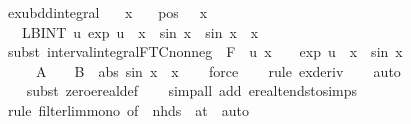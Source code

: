 \documentclass[leqno]{article}
\theoremstyle{definition}
\begin{document}
\begin{figure}
\begin{isabellebody}
\isamarkupfalse%
\ ex{\isacharunderscore}{}{}{\isacharunderscore}{}{\isacharunderscore}{}{\isacharunderscore}ubdd{\isacharunderscore}integral{\isacharcolon}\isanewline
\ \ \ x\isanewline
\ \ \ pos{\isacharcolon}\ {\isachardoublequoteopen}{}\ {\isacharless}\ x{\isachardoublequoteclose}\isanewline
\ \ \ {\isachardoublequoteopen}LBINT\ u{\isacharequal}{}{\isachardot}{\isachardot}{\isasyminfinity}{\isachardot}\ {\isasymbar}exp\ {\isacharparenleft}{\isacharminus}u\ {\isacharasterisk}\ x{\isacharparenright}\ {\isacharasterisk}\ sin\ x{\isasymbar}\ {\isacharequal}\ {\isasymbar}sin\ x{\isasymbar}\ {\isacharslash}\ x{\isachardoublequoteclose}\ \isanewline
\ \isamarkupfalse%
\ {\isacharparenleft}subst\ interval{\isacharunderscore}integral{\isacharunderscore}FTC{\isacharunderscore}nonneg\ {\isacharbrackleft}\ F\ {\isacharequal}\ {\isachardoublequoteopen}{\isasymlambda}u{\isachardot}\ {}{\isacharslash}x\ {\isacharasterisk}\ {\isacharparenleft}{}\ {\isacharminus}\ exp\ {\isacharparenleft}{\isacharminus}u\ {\isacharasterisk}\ x{\isacharparenright}{\isacharparenright}\ {\isacharasterisk}\ {\isasymbar}sin\ x{\isasymbar}{\isachardoublequoteclose}\isanewline
\ \ \ \ \ A\ {\isacharequal}\ {}\ \ B\ {\isacharequal}\ {\isachardoublequoteopen}abs\ {\isacharparenleft}sin\ x{\isacharparenright}\ {\isacharslash}\ x{\isachardoublequoteclose}{\isacharbrackright}{\isacharparenright}\isanewline
\ \ \isamarkupfalse%
\ force\isanewline
\ \ \isamarkupfalse%
\ {\isacharparenleft}rule\ ex{\isacharunderscore}{}{}{\isacharunderscore}{}{\isacharunderscore}{}{\isacharunderscore}deriv{\isacharparenright}\isanewline
\ \ \isamarkupfalse%
\ auto\isanewline
\ \ \isanewline
\ \ \isamarkupfalse%
\ {\isacharparenleft}subst\ zero{\isacharunderscore}ereal{\isacharunderscore}def{\isacharparenright}{\isacharplus}\isanewline
\ \ \isamarkupfalse%
\ {\isacharparenleft}simp{\isacharunderscore}all\ add{\isacharcolon}\ ereal{\isacharunderscore}tendsto{\isacharunderscore}simps{\isacharparenright}\isanewline
\ \ \isanewline
\ \ \isamarkupfalse%
\ {\isacharparenleft}rule\ filterlim{\isacharunderscore}mono\ {\isacharbrackleft}of\ {\isacharunderscore}\ {\isachardoublequoteopen}nhds\ {}{\isachardoublequoteclose}\ {\isachardoublequoteopen}at\ {}{\isachardoublequoteclose}{\isacharbrackright}{\isacharcomma}\ auto{\isacharparenright}\isanewline

\end{isabellebody}
\end{figure}
\end{document}

